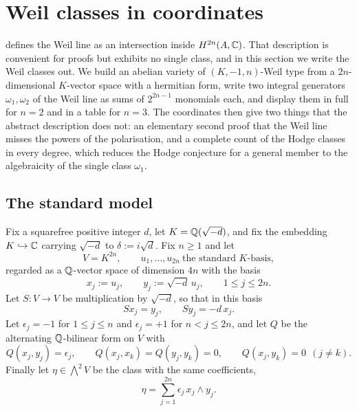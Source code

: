\section{Weil classes in coordinates}\label{sec:explicit}

 defines the Weil line as an intersection inside
$H^{2n}(A,\mathbb{C})$. That description is convenient for proofs but exhibits no
single class, and in this section we write the Weil classes out. We build an
abelian variety of $(K,-1,n)$-Weil type from a $2n$-dimensional $K$-vector
space with a hermitian form, write two integral generators
$\omega_{1},\omega_{2}$ of the Weil line as sums of $2^{2n-1}$ monomials each,
and display them in full for $n=2$ and in a table for $n=3$. The coordinates
then give two things that the abstract description does not: an elementary
second proof that the Weil line misses the powers of the polarisation, and a
complete count of the Hodge classes in every degree, which reduces the Hodge
conjecture for a general member to the algebraicity of the single class
$\omega_{1}$.

\subsection{The standard model}

\begin{setupenv}\label{setup:model}
Fix a squarefree positive integer $d$, let $K=\mathbb{Q}(\sqrt{-d})$, and fix the
embedding $K\hookrightarrow\mathbb{C}$ carrying $\sqrt{-d}$ to $\delta:=i\sqrt{d}$.
Fix $n\ge1$ and let
\[
  V=K^{2n},
  \qquad
  u_{1},\dots,u_{2n}\ \text{the standard $K$-basis},
\]
regarded as a $\mathbb{Q}$-vector space of dimension $4n$ with the basis
\[
  x_{j}:=u_{j},
  \qquad
  y_{j}:=\sqrt{-d}\,u_{j},
  \qquad 1\le j\le 2n .
\]
Let $S\colon V\to V$ be multiplication by $\sqrt{-d}$, so that in this basis
\begin{equation}\label{eq:Sbasis}
  S x_{j}=y_{j},
  \qquad
  S y_{j}=-d\,x_{j}.
\end{equation}
Let $\epsilon_{j}=-1$ for $1\le j\le n$ and $\epsilon_{j}=+1$ for
$n<j\le 2n$, and let $Q$ be the alternating $\mathbb{Q}$-bilinear form on $V$ with
\begin{equation}\label{eq:Qbasis}
  Q(x_{j},y_{j})=\epsilon_{j},
  \qquad
  Q(x_{j},x_{k})=Q(y_{j},y_{k})=0,
  \qquad
  Q(x_{j},y_{k})=0 \ \ (j\ne k).
\end{equation}
Finally let $\eta\in\bigwedge^{2}V$ be the class with the same coefficients,
\begin{equation}\label{eq:etabasis}
  \eta=\sum_{j=1}^{2n}\epsilon_{j}\,x_{j}\wedge y_{j}.
\end{equation}
\end{setupenv}

